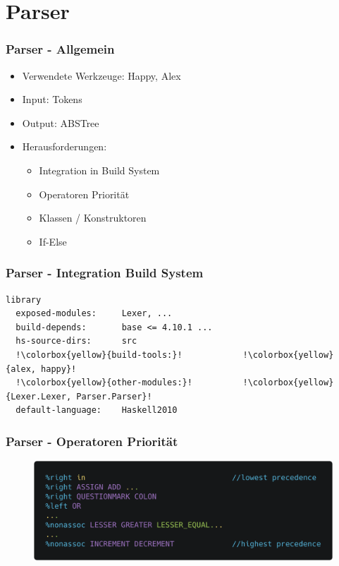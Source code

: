 \section{Parser}

\begin{frame}
	\frametitle{Parser - Allgemein}
	\begin{itemize}
		\item Verwendete Werkzeuge: Happy, Alex
		\item Input: Tokens
		\item Output: ABSTree
		\item Herausforderungen:
			\begin{itemize}
				\item Integration in Build System
				\item Operatoren Priorität
				\item Klassen / Konstruktoren
				\item If-Else
			\end{itemize}
	\end{itemize}
\end{frame}

\begin{frame}[fragile]
	\frametitle{Parser - Integration Build System}
	\begin{lstlisting}[escapechar=!]
library
  exposed-modules:     Lexer, ...
  build-depends:       base <= 4.10.1 ...
  hs-source-dirs:      src
  !\colorbox{yellow}{build-tools:}!            !\colorbox{yellow}{alex, happy}!
  !\colorbox{yellow}{other-modules:}!          !\colorbox{yellow}{Lexer.Lexer, Parser.Parser}!
  default-language:    Haskell2010
	\end{lstlisting}

\end{frame}

\begin{frame}[fragile]
	\frametitle{Parser - Operatoren Priorität}
	\begin{figure}[H]
		\centering
		\includegraphics[width=0.7\linewidth]{images/parser/operator-precedence.png}
	\end{figure}
\end{frame}

